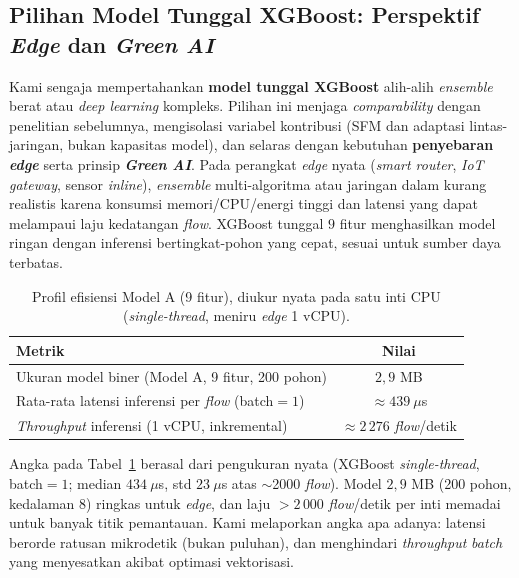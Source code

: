 \documentclass[11pt,a4paper]{article}
\begin{document}
\subsection{Pilihan Model Tunggal XGBoost: Perspektif \emph{Edge} dan \emph{Green AI}}
\label{sec:edge}
Kami sengaja mempertahankan \textbf{model tunggal XGBoost} alih-alih
\emph{ensemble} berat atau \emph{deep learning} kompleks. Pilihan ini menjaga
\emph{comparability} dengan penelitian sebelumnya, mengisolasi variabel kontribusi
(SFM dan adaptasi lintas-jaringan, bukan kapasitas model), dan selaras dengan
kebutuhan \textbf{penyebaran \emph{edge}} serta prinsip \textbf{\emph{Green AI}}.
Pada perangkat \emph{edge} nyata (\emph{smart router}, \emph{IoT gateway}, sensor
\emph{inline}), \emph{ensemble} multi-algoritma atau jaringan dalam kurang realistis
karena konsumsi memori/CPU/energi tinggi dan latensi yang dapat melampaui laju
kedatangan \emph{flow}. XGBoost tunggal $9$ fitur menghasilkan model ringan dengan
inferensi bertingkat-pohon yang cepat, sesuai untuk sumber daya terbatas.

\begin{table}[h]
\centering
\caption{Profil efisiensi Model A (9 fitur), diukur nyata pada satu inti CPU
(\emph{single-thread}, meniru \emph{edge} 1 vCPU).}
\label{tab:efficiency}
\begin{tabular}{lc}
\toprule
Metrik & Nilai \\
\midrule
Ukuran model biner (Model A, 9 fitur, 200 pohon) & $2{,}9$ MB \\
Rata-rata latensi inferensi per \emph{flow} (batch$=1$) & $\approx 439\ \mu$s \\
\emph{Throughput} inferensi (1 vCPU, inkremental) & $\approx 2\,276$ \emph{flow}/detik \\
\bottomrule
\end{tabular}
\end{table}

\noindent Angka pada Tabel~\ref{tab:efficiency} berasal dari pengukuran nyata
(XGBoost \emph{single-thread}, batch$=1$; median $434\ \mu$s, std $23\ \mu$s atas
$\sim$2000 \emph{flow}). Model $2{,}9$ MB (200 pohon, kedalaman 8) ringkas untuk
\emph{edge}, dan laju $>2\,000$ \emph{flow}/detik per inti memadai untuk banyak titik
pemantauan. Kami melaporkan angka apa adanya: latensi berorde ratusan mikrodetik (bukan
puluhan), dan menghindari \emph{throughput} \emph{batch} yang menyesatkan akibat
optimasi vektorisasi.
\end{document}
